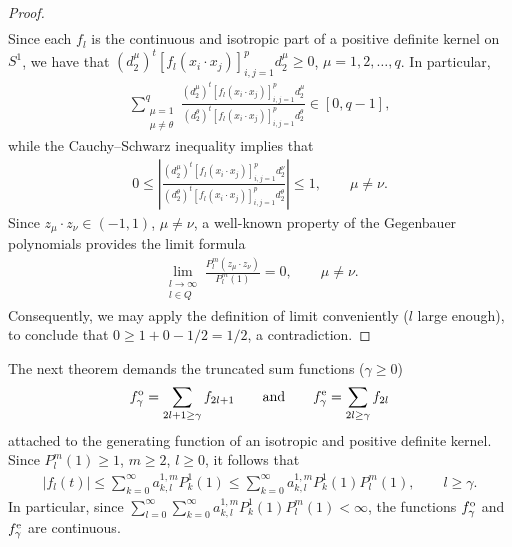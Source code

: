 \documentclass[pdftex]{sigma}
\numberwithin{equation}{section}
\begin{document}
\begin{proof}
\begin{gather*}
\end{gather*}
Since each $f_l$ is the continuous and isotropic part of a positive def\/inite kernel on $S^1$, we have that $(d_2^\mu)^t [f_l(x_i \cdot x_j)]_{i,j=1}^p d_2^\mu\geq 0$, $\mu=1,2,\ldots, q$. In particular,
\begin{gather*}
\sum_{\substack{\mu=1 \\ \mu \neq \theta}}^q \frac{(d_2^\mu)^t [f_l(x_i \cdot x_j)]_{i,j=1}^p d_2^\mu}{(d_2^\theta)^t [f_l(x_i \cdot x_j)]_{i,j=1}^p d_2^\theta} \in [0,q-1],
\end{gather*}
while the Cauchy--Schwarz inequality implies that
\begin{gather*}
0\leq \left|\frac{(d_2^\mu)^t [f_l(x_i \cdot x_j)]_{i,j=1}^p d_2^\nu}{(d_2^\theta)^t [f_l(x_i \cdot x_j)]_{i,j=1}^p d_2^\theta}\right|\leq 1, \qquad \mu \neq \nu.
\end{gather*}
Since $z_\mu \cdot z_\nu \in (-1,1)$, $\mu \neq \nu$, a well-known property of the Gegenbauer polynomials provides the limit formula~\cite[p.~196]{szego}
\begin{gather*}\lim_{\substack{l\to \infty \\ l\in Q}} \frac{P_l^m(z_\mu\cdot z_\nu)}{P_l^m(1)}=0, \qquad \mu \neq \nu.\end{gather*}
Consequently, we may apply the def\/inition of limit conveniently ($l$ large enough), to conclude that $0\geq 1+0-1/2=1/2$, a contradiction.
\end{proof}

The next theorem demands the truncated sum functions ($\gamma\geq 0$)
\begin{gather*}f_\gamma^{\rm o}=\sum_{2l+1\geq \gamma} f_{2l+1} \qquad \mbox{and} \qquad f_\gamma^{\rm e}= \sum_{2l \geq \gamma} f_{2l}\end{gather*}
attached to the generating function of an isotropic and positive def\/inite kernel. Since $P_l^m(1)\geq 1$, $m\geq 2$, $l\geq 0$, it follows that
\begin{gather*}
|f_l(t)| \leq \sum_{k=0}^\infty a_{k,l}^{1,m}P_k^1(1)\leq \sum_{k=0}^\infty a_{k,l}^{1,m}P_k^1(1)P_l^m(1),\qquad l\geq \gamma.
\end{gather*}
In particular, since $\sum\limits_{l=0}^\infty \sum\limits_{k=0}^\infty a_{k,l}^{1,m}P_k^1(1)P_l^m(1) <\infty$, the functions $f_\gamma^{\rm o}$ and $f_\gamma^{\rm e}$ are continuous.
\end{document}
